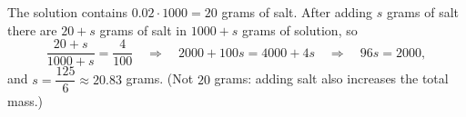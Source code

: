 The solution contains $0.02\cdot1000=20$ grams of salt. After adding $s$ grams of salt there are $20+s$ grams of salt in $1000+s$ grams of solution, so
\[
\dfrac{20+s}{1000+s}=\dfrac{4}{100}\quad\Longrightarrow\quad 2000+100s=4000+4s\quad\Longrightarrow\quad 96s=2000,
\]
and $s=\boxed{\dfrac{125}{6}\approx20.83}$ grams. (Not $20$ grams: adding salt also increases the total mass.)
